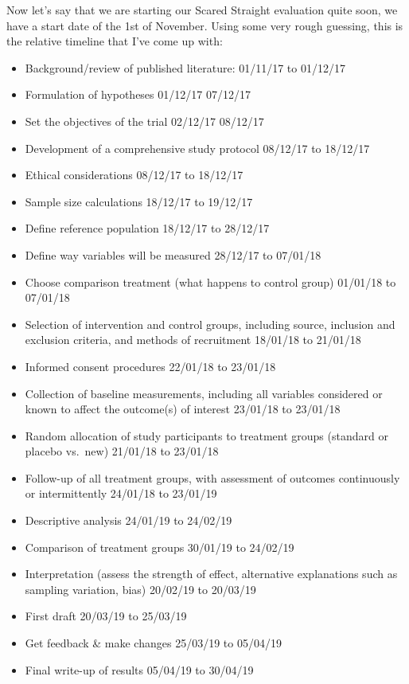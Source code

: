 \documentclass[]{book}
\providecommand{\tightlist}{%
  \setlength{\itemsep}{0pt}\setlength{\parskip}{0pt}}
\theoremstyle{definition}
\theoremstyle{definition}
\theoremstyle{definition}
\theoremstyle{remark}
\begin{document}
Now let's say that we are starting our Scared Straight evaluation quite
soon, we have a start date of the 1st of November. Using some very rough
guessing, this is the relative timeline that I've come up with:

\begin{itemize}
\tightlist
\item
  Background/review of published literature: 01/11/17 to 01/12/17
\item
  Formulation of hypotheses 01/12/17 07/12/17
\item
  Set the objectives of the trial 02/12/17 08/12/17
\item
  Development of a comprehensive study protocol 08/12/17 to 18/12/17
\item
  Ethical considerations 08/12/17 to 18/12/17
\item
  Sample size calculations 18/12/17 to 19/12/17
\item
  Define reference population 18/12/17 to 28/12/17
\item
  Define way variables will be measured 28/12/17 to 07/01/18
\item
  Choose comparison treatment (what happens to control group) 01/01/18
  to 07/01/18
\item
  Selection of intervention and control groups, including source,
  inclusion and exclusion criteria, and methods of recruitment 18/01/18
  to 21/01/18
\item
  Informed consent procedures 22/01/18 to 23/01/18
\item
  Collection of baseline measurements, including all variables
  considered or known to affect the outcome(s) of interest 23/01/18 to
  23/01/18
\item
  Random allocation of study participants to treatment groups (standard
  or placebo vs.~new) 21/01/18 to 23/01/18
\item
  Follow-up of all treatment groups, with assessment of outcomes
  continuously or intermittently 24/01/18 to 23/01/19
\item
  Descriptive analysis 24/01/19 to 24/02/19
\item
  Comparison of treatment groups 30/01/19 to 24/02/19
\item
  Interpretation (assess the strength of effect, alternative
  explanations such as sampling variation, bias) 20/02/19 to 20/03/19
\item
  First draft 20/03/19 to 25/03/19
\item
  Get feedback \& make changes 25/03/19 to 05/04/19
\item
  Final write-up of results 05/04/19 to 30/04/19
\end{itemize}
\end{document}
